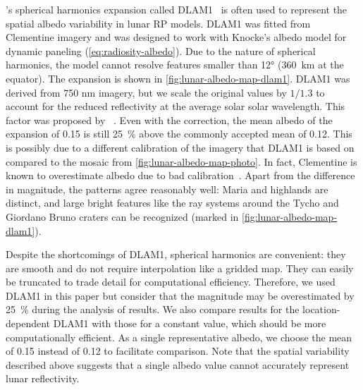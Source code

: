 \citeauthor{Floberghagen1999}'s  spherical harmonics expansion called \gls{DLAM1}~\cite{Floberghagen1999} is often used to represent the spatial albedo variability in lunar \gls{RP} models. \gls{DLAM1} was fitted from Clementine imagery and was designed to work with Knocke's albedo model for dynamic paneling (\cref{eq:radiosity-albedo}). Due to the nature of spherical harmonics, the model cannot resolve features smaller than \ang{12} (\qty{360}{\km} at the equator). The expansion is shown in \cref{fig:lunar-albedo-map-dlam1}. \gls{DLAM1} was derived from 750 nm imagery, but we scale the original values by $1/1.3$ to account for the reduced reflectivity at the average solar solar wavelength. This factor was proposed by \citeauthor{Vasavada2012}~\cite{Vasavada2012}. Even with the correction, the mean albedo of the expansion of 0.15 is still \qty{25}{\percent} above the commonly accepted mean of 0.12. This is possibly due to a different calibration of the imagery that \gls{DLAM1} is based on compared to the mosaic from \cref{fig:lunar-albedo-map-photo}. In fact, Clementine is known to overestimate albedo due to bad calibration~\cite{Shkuratov2011}. Apart from the difference in magnitude, the patterns agree reasonably well: Maria and highlands are distinct, and large bright features like the ray systems around the Tycho and Giordano Bruno craters can be recognized (marked in \cref{fig:lunar-albedo-map-dlam1}).

Despite the shortcomings of \gls{DLAM1}, spherical harmonics are convenient: they are smooth and do not require interpolation like a gridded map. They can easily be truncated to trade detail for computational efficiency. Therefore, we used \gls{DLAM1} in this paper but consider that the magnitude may be overestimated by \qty{25}{\percent} during the analysis of results. We also compare results for the location-dependent \gls{DLAM1} with those for a constant value, which should be more computationally efficient. As a single representative albedo, we choose the mean of 0.15 instead of 0.12 to facilitate comparison. Note that the spatial variability described above suggests that a single albedo value cannot accurately represent lunar reflectivity.

